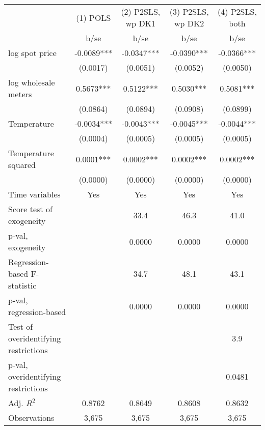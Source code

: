 \begin{tabular}{lcccc}\toprule
                    &    (1) POLS   &(2) P2SLS, wp DK1   &(3) P2SLS, wp DK2   &(4) P2SLS, both   \\
                    &        b/se   &        b/se   &        b/se   &        b/se   \\
\midrule
log spot price      &     -0.0089***&     -0.0347***&     -0.0390***&     -0.0366***\\
                    &    (0.0017)   &    (0.0051)   &    (0.0052)   &    (0.0050)   \\
log wholesale meters&      0.5673***&      0.5122***&      0.5030***&      0.5081***\\
                    &    (0.0864)   &    (0.0894)   &    (0.0908)   &    (0.0899)   \\
Temperature         &     -0.0034***&     -0.0043***&     -0.0045***&     -0.0044***\\
                    &    (0.0004)   &    (0.0005)   &    (0.0005)   &    (0.0005)   \\
Temperature squared &      0.0001***&      0.0002***&      0.0002***&      0.0002***\\
                    &    (0.0000)   &    (0.0000)   &    (0.0000)   &    (0.0000)   \\
Time variables      &         Yes   &         Yes   &         Yes   &         Yes   \\
\midrule
Score test of exogeneity&               &        33.4   &        46.3   &        41.0   \\
p-val, exogeneity   &               &      0.0000   &      0.0000   &      0.0000   \\
Regression-based F-statistic&               &        34.7   &        48.1   &        43.1   \\
p-val, regression-based&               &      0.0000   &      0.0000   &      0.0000   \\
Test of overidentifying restrictions&               &               &               &         3.9   \\
p-val, overidentifying restrictions&               &               &               &      0.0481   \\
Adj. \(R^2\)        &      0.8762   &      0.8649   &      0.8608   &      0.8632   \\
Observations        &       3,675   &       3,675   &       3,675   &       3,675   \\
\bottomrule\end{tabular}
